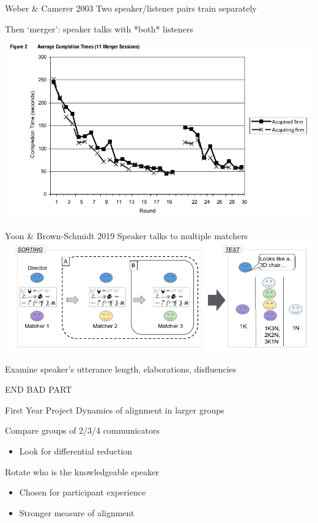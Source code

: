 \documentclass[ 12pt, xcolor=beamer,table,usenames,dvipsnames, ignorenonframetext, ngerman]{beamer}
\begin{document}
\begin{frame}{Weber \& Camerer 2003}
	\pause
	Two speaker/listener pairs train separately 
	
	Then `merger': speaker talks with *both* listeners \pause
	
	\includegraphics[width=\textwidth]{../images/weber.png}
	
\end{frame}

\begin{frame}{Yoon \& Brown-Schmidt 2019}
	Speaker talks to multiple matchers \\
	
	
	\includegraphics[width=\textwidth]{../images/yoon_diagram.png}
	
	Examine speaker's utterance length, elaborations, disfluencies
\end{frame}

\begin{frame}
	END BAD PART
\end{frame}
%
\begin{frame}{First Year Project}
	Dynamics of alignment in larger groups \pause
	
	Compare groups of 2/3/4 communicators
	\begin{itemize}
		\item Look for differential reduction \pause
	\end{itemize} 
Rotate who is the knowledgeable speaker
\begin{itemize}
	\item Chosen for participant experience
	\item Stronger measure of alignment
\end{itemize}

\end{frame}
\end{document}
